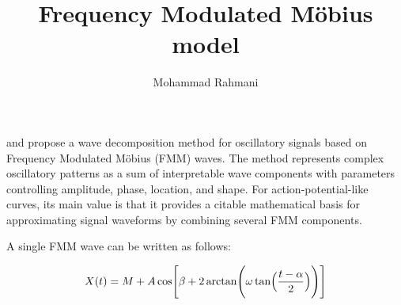 \documentclass[a4paper]{article}
\title{Frequency Modulated M\"obius model}
\date{}
\author{Mohammad Rahmani}
\begin{document}
    \maketitle
    
    
    \cite{rueda-2021-a-novel-wave-decomposition-for-oscillatory-signals}
    and
    \cite{rodriguez-collado-2021-identification-of-action-potential-waveforms}
    propose a wave decomposition method for oscillatory signals based on Frequency Modulated M\"obius (FMM) waves.
    The method represents complex oscillatory patterns as a sum of interpretable wave components with parameters controlling amplitude, phase, location, and shape.
    For action-potential-like curves, its main value is that it provides a citable mathematical basis for approximating signal waveforms by combining several FMM components.
    
    A single FMM wave can be written as follows:
    
    \begin{equation}
        X(t)
        =
        M
        +
        A
        \cos
        \Biggl[
            \beta
            +
            2
            \arctan
            \Biggl(
            \omega
            \tan
            \Bigl(
            \frac{t-\alpha}{2}
            \Bigr)
            \Biggr)
            \Biggr]
    \end{equation}
    
\end{document}
